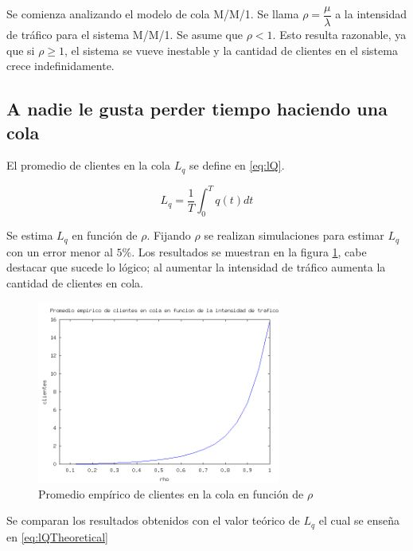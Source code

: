 \documentclass{sig-alternate}
\begin{document}

Se comienza analizando el modelo de cola M/M/1.
Se llama $\rho = \dfrac{\mu}{\lambda}$ a la intensidad de tr\'afico para el sistema M/M/1.
Se asume que $\rho < 1$. Esto resulta razonable, ya que si $\rho \geq 1$, el sistema se vueve inestable y la cantidad
de clientes en el sistema crece indefinidamente.

\subsection{A nadie le gusta perder tiempo haciendo una cola}
\label{sec:parte1}
El promedio de clientes en la cola $L_q$ se define en \eqref{eq:lQ}.

\begin{equation}
\label{eq:lQ}
L_q = \dfrac{1}{T} \int_{0}^{T} q(t) dt
\end{equation}

Se estima $L_q$ en funci\'on de $\rho$. Fijando $\rho$ se realizan simulaciones para estimar $L_q$
con un error menor al $5\%$. Los resultados se muestran en la figura \ref{fig:meanQueue}, cabe destacar
que sucede lo l\'ogico; al aumentar la intensidad de tr\'afico aumenta la cantidad de clientes en cola.\\

\begin{figure}[ht]
\begin{center}
\includegraphics[width=8cm]{queueEmpiricVSrho}
\caption{\label{fig:meanQueue} Promedio emp\'irico de clientes en la cola en funci\'on de $\rho$}
\end{center}
\end{figure}

Se comparan los resultados obtenidos con el valor te\'orico de $L_q$ el cual se ense\~na en \eqref{eq:lQTheoretical}

\end{document}
